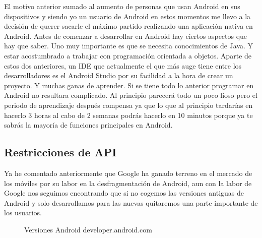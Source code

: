 El motivo anterior sumado al aumento de personas que usan Android en sus dispositivos y siendo yo un usuario de Android en estos momentos me llevo a la decisión de querer sacarle el máximo partido realizando una aplicación nativa en Android.
Antes de comenzar a desarrollar en Android hay ciertos aspectos que hay que saber.
Uno muy importante es que se necesita conocimientos de Java.
Y estar acostumbrado a trabajar con programación orientada a objetos.
Aparte de estos dos anteriores, un IDE que actualmente el que más auge tiene entre los desarrolladores es el Android Studio por su facilidad a la hora de crear un proyecto.
Y muchas ganas de aprender.
Si se tiene todo lo anterior programar en Android no resultara complicado. Al principio parecerá todo un poco lioso pero el periodo de aprendizaje después compensa ya que lo que al principio tardarías en hacerlo 3 horas al cabo de 2 semanas podrás hacerlo en 10 minutos porque ya te sabrás la mayoría de funciones principales en Android.

\subsection{Restricciones de API}
\label{subsecc:Restricciones de API}

Ya he comentado anteriormente que Google ha ganado terreno en el mercado de los móviles por su labor en la desfragmentación de Android, aun con la labor de Google nos seguimos encontrando que si no cogemos las versiones antiguas de Android y solo desarrollamos para las nuevas quitaremos una parte importante de los usuarios.

\begin{figure}[H] 
  \begin{center} 
    \caption{Versiones Android developer.android.com} 
    \label{fig:VersionesAndroid2} 
  \end{center} 
\end{figure}

